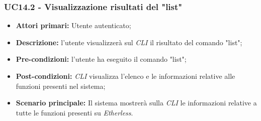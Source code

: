 \subsubsection{UC14.2 - Visualizzazione risultati del "list"}
\begin{itemize}
	\item \textbf{Attori primari:} Utente autenticato;
	\item \textbf{Descrizione:} l'utente visualizzerà sul \textit{CLI\glo} il risultato del comando "list";
	\item \textbf{Pre-condizioni:} l'utente ha eseguito il comando "list";
	\item \textbf{Post-condizioni:} \textit{CLI\glo} visualizza l'elenco e le informazioni relative alle funzioni presenti nel sistema;
	\item \textbf{Scenario principale:} Il sistema mostrerà sulla \textit{CLI\glo} le informazioni relative a tutte le funzioni presenti su \textit{Etherless\glos}.
\end{itemize}
